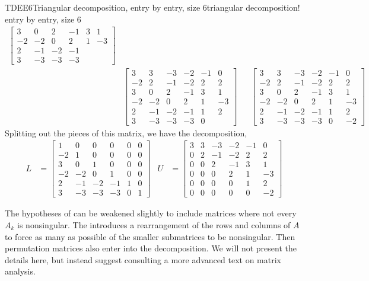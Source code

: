\begin{example}{TDEE6}{Triangular decomposition, entry by entry, size 6}{triangular decomposition! entry by entry, size 6}
\begin{align*}
\begin{bmatrix}
 3 & 0 & 2 & -1 & 3 & 1 \\
 -2 & -2 & 0 & 2 & 1 & -3 \\
 2 & -1 & -2 & -1  \\
 3 & -3 & -3 & -3
\end{bmatrix}\\
&
\begin{bmatrix}
 3 & 3 & -3 & -2 & -1 & 0 \\
 -2 & 2 & -1 & -2 & 2 & 2 \\
 3 & 0 & 2 & -1 & 3 & 1 \\
 -2 & -2 & 0 & 2 & 1 & -3 \\
 2 & -1 & -2 & -1 & 1 & 2 \\
 3 & -3 & -3 & -3 & 0
\end{bmatrix}
&&
\begin{bmatrix}
 3 & 3 & -3 & -2 & -1 & 0 \\
 -2 & 2 & -1 & -2 & 2 & 2 \\
 3 & 0 & 2 & -1 & 3 & 1 \\
 -2 & -2 & 0 & 2 & 1 & -3 \\
 2 & -1 & -2 & -1 & 1 & 2 \\
 3 & -3 & -3 & -3 & 0 & -2
\end{bmatrix}
%
\end{align*}
%
Splitting out the pieces of this matrix, we have the decomposition,
%
\begin{align*}
L&=
\begin{bmatrix}
 1 & 0 & 0 & 0 & 0 & 0 \\
 -2 & 1 & 0 & 0 & 0 & 0 \\
 3 & 0 & 1 & 0 & 0 & 0 \\
 -2 & -2 & 0 & 1 & 0 & 0 \\
 2 & -1 & -2 & -1 & 1 & 0 \\
 3 & -3 & -3 & -3 & 0 & 1
\end{bmatrix}
&
U&=
\begin{bmatrix}
 3 & 3 & -3 & -2 & -1 & 0 \\
 0 & 2 & -1 & -2 & 2 & 2 \\
 0 & 0 & 2 & -1 & 3 & 1 \\
 0 & 0 & 0 & 2 & 1 & -3 \\
 0 & 0 & 0 & 0 & 1 & 2 \\
 0 & 0 & 0 & 0 & 0 & -2
\end{bmatrix}
%
\end{align*}
%
\end{example}
%
The hypotheses of  can be weakened slightly to include matrices where not every $A_k$ is nonsingular.  The introduces a rearrangement of the rows and columns of $A$ to force as many as possible of the smaller submatrices to be nonsingular.  Then permutation matrices also enter into the decomposition.  We will not present the details here, but instead suggest consulting a more advanced text on matrix analysis.
%



